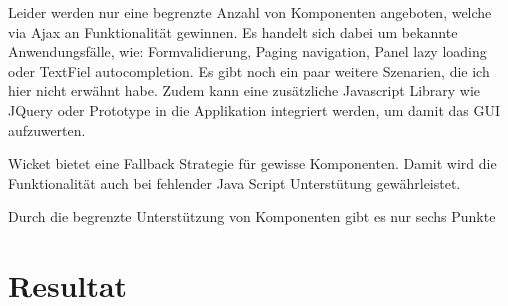  Leider werden nur eine begrenzte Anzahl von Komponenten angeboten, welche
  via \ac{Ajax} an Funktionalität gewinnen. Es handelt sich dabei um bekannte
  Anwendungsfälle, wie: Formvalidierung, Paging navigation, Panel lazy loading
  oder TextFiel autocompletion. Es gibt noch ein paar weitere Szenarien,
  die ich hier nicht erwähnt habe. Zudem kann eine zusätzliche Javascript
  Library wie JQuery oder Prototype in die Applikation integriert werden, um
  damit das \ac{GUI} aufzuwerten.
  
  Wicket bietet eine Fallback Strategie für gewisse Komponenten. Damit wird die
  Funktionalität auch bei fehlender Java Script Unterstütung gewährleistet.
  
  Durch die begrenzte Unterstützung von Komponenten gibt es nur sechs Punkte

  \section{Resultat}